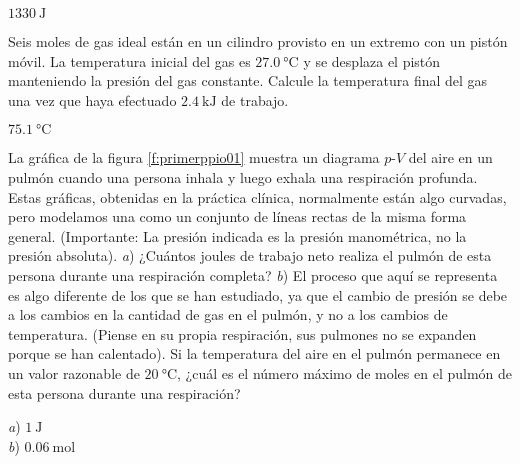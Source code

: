 \begin{Answer}
  $\SI{1330}{\joule}$
\end{Answer}
%
\begin{Exercise}
  Seis moles de gas ideal están en un cilindro provisto en un extremo con un pistón móvil. La temperatura inicial del gas es $\SI{27.0}{\celsius}$ y se desplaza el pistón manteniendo la presión del gas constante. Calcule la temperatura final del gas una vez que haya efectuado $\SI{2.4}{\kilo\joule}$ de trabajo.
\end{Exercise}
\begin{Answer}
  $\SI{75.1}{\celsius}$
\end{Answer}
%
\begin{Exercise}\label{p:primerppio01}
  La gráfica de la figura \ref{f:primerppio01} muestra un diagrama $p$-$V$ del aire en un pulmón cuando una persona inhala y luego exhala una respiración profunda. Estas gráficas, obtenidas en la práctica clínica, normalmente están algo curvadas, pero modelamos una como un conjunto de líneas rectas de la misma forma general. (Importante: La presión indicada es la presión manométrica, no la presión absoluta). \textit{a}) ¿Cuántos joules de trabajo neto realiza el pulmón de esta persona durante una respiración completa? \textit{b}) El proceso que aquí se representa es algo diferente de los que se han estudiado, ya que el cambio de presión se debe a los cambios en la cantidad de gas en el pulmón, y no a los cambios de temperatura. (Piense en su propia respiración, sus pulmones no se expanden porque se han calentado). Si la temperatura del aire en el pulmón permanece en un valor razonable de $\SI{20}{\celsius}$, ¿cuál es el número máximo de moles en el pulmón de esta persona durante una respiración?
\end{Exercise}
\begin{Answer}
	\begin{minipage}[t]{.4\textwidth}
    \textit{a}) $\SI{1}{\joule}$\\ \textit{b}) $\SI{0.06}{\mole}$
  \end{minipage}
\end{Answer}
%

